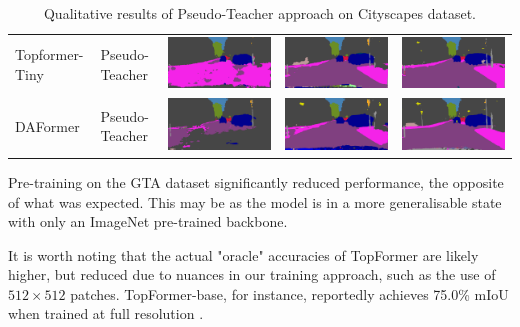 \documentclass[a4paper,12pt]{report}
\begin{document}
\begin{table}[hb]
{\begin{tabular}{lllll}
            Topformer-Tiny & Pseudo-Teacher    & \includegraphics[width=.2\linewidth,valign=m]{res/pseudo-teacher-qualitative/topformer-tiny-sourceonly.png} & \includegraphics[width=.2\linewidth,valign=m]{res/pseudo-teacher-qualitative/topformer-tiny-pseudo-teacher.png} & \includegraphics[width=.2\linewidth,valign=m]{res/pseudo-teacher-qualitative/topformer-tiny-oracle.png} \\
            DAFormer       & Pseudo-Teacher    & \includegraphics[width=.2\linewidth,valign=m]{res/pseudo-teacher-qualitative/daformer-sourceonly.png}       & \includegraphics[width=.2\linewidth,valign=m]{res/pseudo-teacher-qualitative/daformer-uda.png}                  & \includegraphics[width=.2\linewidth,valign=m]{res/pseudo-teacher-qualitative/daformer-oracle.png}       \\
        \end{tabular}
    }
    \caption{Qualitative results of Pseudo-Teacher approach on Cityscapes dataset.}
    \label{fig:pseudo-teacher-qualitative}
\end{table}

Pre-training on the GTA dataset significantly reduced performance, the opposite of what was expected. This may be as the model is in a more generalisable state with only an ImageNet pre-trained backbone.

It is worth noting that the actual "oracle" accuracies of TopFormer are likely higher, but reduced due to nuances in our training approach, such as the use of $512 \times 512$ patches. TopFormer-base, for instance, reportedly achieves 75.0\% mIoU when trained at full resolution \cite{zhang_topformer_2022}.
\end{document}
